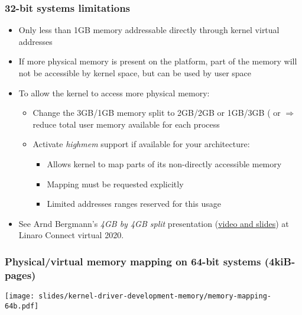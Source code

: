 \begin{frame}
  \frametitle{32-bit systems limitations}
  \begin{itemize}
  \item Only less than 1GB memory addressable directly through kernel
    virtual addresses
  \item If more physical memory is present on the platform, part of
    the memory will not be accessible by kernel space, but can be used
    by user space
  \item To allow the kernel to access more physical memory:
    \begin{itemize}
    \item Change the 3GB/1GB memory split to 2GB/2GB or 1GB/3GB
      ( or 
      $\Rightarrow$ reduce total user memory available for each process
    \item Activate \emph{highmem} support if available for your
      architecture:
      \begin{itemize}
      \item Allows kernel to map parts of its non-directly accessible
            memory
      \item Mapping must be requested explicitly
      \item Limited addresses ranges reserved for this usage
      \end{itemize}
    \end{itemize}
  \item See Arnd Bergmann's {\em 4GB by 4GB split} presentation
        (\href{https://resources.linaro.org/en/resource/TXkzgNDFp3HiJKdfQjbssL}
        {video and slides}) at Linaro Connect virtual 2020.
  \end{itemize}
\end{frame}

\begin{frame}
  \frametitle{Physical/virtual memory mapping on 64-bit systems (4kiB-pages)}
  \begin{center}
    \texttt{[image: slides/kernel-driver-development-memory/memory-mapping-64b.pdf]}
  \end{center}
\end{frame}


